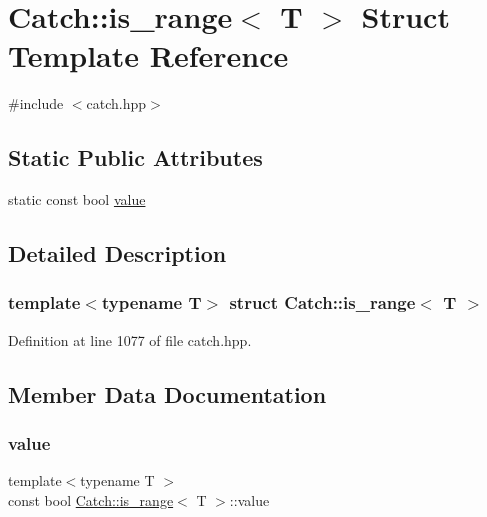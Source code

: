 \hypertarget{struct_catch_1_1is__range}{}\section{Catch\+:\+:is\+\_\+range$<$ T $>$ Struct Template Reference}
\label{struct_catch_1_1is__range}


{\ttfamily \#include $<$catch.\+hpp$>$}

\subsection*{Static Public Attributes}
\begin{DoxyCompactItemize}
\item 
static const bool \mbox{\hyperlink{struct_catch_1_1is__range_afaec39e819c3956829cbbd00feba11be}{value}}
\end{DoxyCompactItemize}


\subsection{Detailed Description}
\subsubsection*{template$<$typename T$>$\newline
struct Catch\+::is\+\_\+range$<$ T $>$}



Definition at line 1077 of file catch.\+hpp.



\subsection{Member Data Documentation}
\mbox{\label{struct_catch_1_1is__range_afaec39e819c3956829cbbd00feba11be}} 
\subsubsection{\texorpdfstring{value}{value}}
{\footnotesize\ttfamily template$<$typename T $>$ \\
const bool \mbox{\hyperlink{struct_catch_1_1is__range}{Catch\+::is\+\_\+range}}$<$ T $>$\+::value\hspace{0.3cm}{\ttfamily [static]}}


